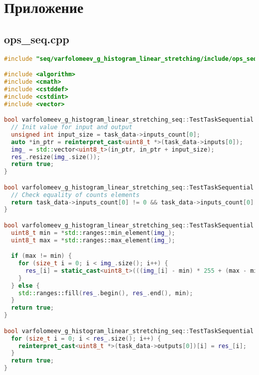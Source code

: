 \documentclass[a4paper,12pt]{article}
\begin{document}
\section{Приложение}
\subsection{ops\_seq.cpp}
\begin{lstlisting}[language=C++,
    breaklines=true,       % Автоматический перенос строк
    columns=fullflexible ]
#include "seq/varfolomeev_g_histogram_linear_stretching/include/ops_seq.hpp"

#include <algorithm>
#include <cmath>
#include <cstddef>
#include <cstdint>
#include <vector>

bool varfolomeev_g_histogram_linear_stretching_seq::TestTaskSequential::PreProcessingImpl() {
  // Init value for input and output
  unsigned int input_size = task_data->inputs_count[0];
  auto *in_ptr = reinterpret_cast<uint8_t *>(task_data->inputs[0]);
  img_ = std::vector<uint8_t>(in_ptr, in_ptr + input_size);
  res_.resize(img_.size());
  return true;
}

bool varfolomeev_g_histogram_linear_stretching_seq::TestTaskSequential::ValidationImpl() {
  // Check equality of counts elements
  return task_data->inputs_count[0] != 0 && task_data->inputs_count[0] == task_data->outputs_count[0];
}

bool varfolomeev_g_histogram_linear_stretching_seq::TestTaskSequential::RunImpl() {
  uint8_t min = *std::ranges::min_element(img_);
  uint8_t max = *std::ranges::max_element(img_);

  if (max != min) {
    for (size_t i = 0; i < img_.size(); i++) {
      res_[i] = static_cast<uint8_t>(((img_[i] - min) * 255 + (max - min) / 2) / (max - min));
    }
  } else {
    std::ranges::fill(res_.begin(), res_.end(), min);
  }
  return true;
}

bool varfolomeev_g_histogram_linear_stretching_seq::TestTaskSequential::PostProcessingImpl() {
  for (size_t i = 0; i < res_.size(); i++) {
    reinterpret_cast<uint8_t *>(task_data->outputs[0])[i] = res_[i];
  }
  return true;
}
\end{lstlisting}
\end{document}
